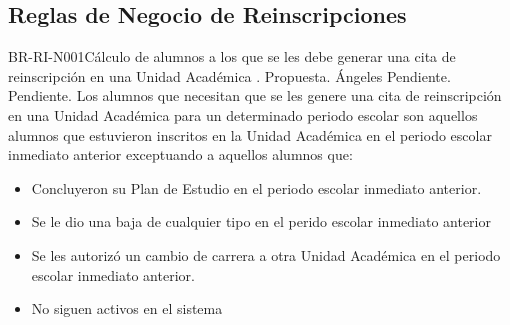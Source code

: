 \subsection{Reglas de Negocio de Reinscripciones}

\begin{BusinessRule}{BR-RI-N001}{Cálculo de alumnos a los que se les debe generar una cita de reinscripción en una Unidad Académica}
	{\bcDerivation}    %
	{\btTimer}     %
	{\blControlling}    %
	.
	\BRItem[Estado] Propuesta.
	 Ángeles
	 Pendiente.
	 Pendiente.
	\BRItem[Descripción] Los alumnos que necesitan que se les genere una cita de reinscripción en una Unidad Académica para un determinado periodo escolar son aquellos alumnos que estuvieron inscritos en la Unidad Académica en el periodo escolar inmediato anterior exceptuando a aquellos alumnos que:
		\begin{itemize}
			\item Concluyeron su Plan de Estudio en el periodo escolar inmediato anterior.
			\item Se le dio una baja de cualquier tipo en el perido escolar inmediato anterior
			\item Se les autorizó un cambio de carrera a otra Unidad Académica en el periodo escolar inmediato anterior.
			\item No siguen activos en el sistema
		\end{itemize}
	

\end{BusinessRule}

